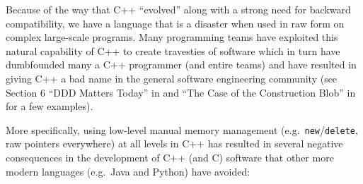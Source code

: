 \documentclass[pdf,ps2pdf,11pt]{SANDreport}
\begin{document}
Because of the way that C++ ``evolved'' along with a strong need for
backward compatibility, we have a language that is a disaster when
used in raw form on complex large-scale programs.  Many programming
teams have exploited this natural capability of C++ to create
travesties of software which in turn have dumbfounded many a C++
programmer (and entire teams) and have resulted in giving C++ a bad
name in the general software engineering community (see Section 6
``DDD Matters Today'' in {}\cite{DomainDrivenDesignQuickly} and ``The
Case of the Construction Blob'' in {}\cite[Chapter
9]{WorkingEffectivelyWithLegacyCode05} for a few examples).

More specifically, using low-level manual memory management (e.g.\
{}\texttt{new}/{}\texttt{delete}, raw pointers everywhere) at all
levels in C++ has resulted in several negative consequences in the
development of C++ (and C) software that other more modern languages
(e.g.\ Java and Python) have avoided:
\end{document}
